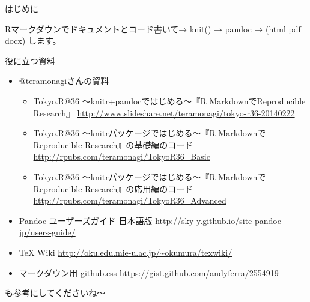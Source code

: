 \begin{frame}{はじめに}

Rマークダウンでドキュメントとコード書いて→ knit() → pandoc → (html
\textbar{} pdf \textbar{} docx) します。

\begin{block}{役に立つ資料}

\begin{itemize}
\itemsep1pt\parskip0pt
\item
  @teramonagiさんの資料

  \begin{itemize}
  \itemsep1pt\parskip0pt
  \item
    Tokyo.R@36 ～knitr+pandocではじめる～『R MarkdownでReproducible
    Research』
    \url{http://www.slideshare.net/teramonagi/tokyo-r36-20140222}
  \item
    Tokyo.R@36 ～knitrパッケージではじめる～『R MarkdownでReproducible
    Research』の基礎編のコード
    \url{http://rpubs.com/teramonagi/TokyoR36_Basic}
  \item
    Tokyo.R@36 ～knitrパッケージではじめる～『R MarkdownでReproducible
    Research』の応用編のコード
    \url{http://rpubs.com/teramonagi/TokyoR36_Advanced}
  \end{itemize}
\item
  Pandoc ユーザーズガイド 日本語版
  \url{http://sky-y.github.io/site-pandoc-jp/users-guide/}
\item
  TeX Wiki \url{http://oku.edu.mie-u.ac.jp/~okumura/texwiki/}
\item
  マークダウン用 github.css
  \url{https://gist.github.com/andyferra/2554919}
\end{itemize}

も参考にしてくださいね〜

\end{block}

\end{frame}

